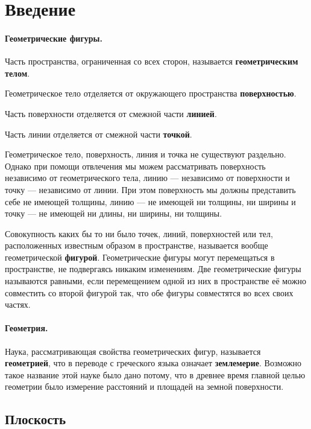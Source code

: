 \section*{Введение}

\paragraph{Геометрические фигуры.}\label{1938/1}
Часть пространства, ограниченная со всех сторон, называется \textbf{геометрическим телом}.

Геометрическое тело отделяется от окружающего пространства \textbf{поверхностью}.

Часть поверхности отделяется от смежной части \textbf{линией}.

Часть линии отделяется от смежной части \textbf{точкой}.

Геометрическое тело, поверхность, линия и точка не существуют раздельно.
Однако при помощи отвлечения мы можем рассматривать поверхность независимо от геометрического тела, линию — независимо от поверхности и точку — независимо от линии.
При этом поверхность мы должны представить себе не имеющей толщины, линию — не имеющей ни толщины, ни ширины и точку — не имеющей ни длины, ни ширины, ни толщины.

Совокупность каких бы то ни было точек, линий, поверхностей или тел, расположенных известным образом в пространстве, называется вообще геометрической \textbf{фигурой}.
Геометрические фигуры могут перемещаться в пространстве, не подвергаясь никаким изменениям.
Две геометрические фигуры называются равными, если перемещением одной из них в пространстве её можно совместить со второй фигурой так, что обе фигуры совместятся во всех своих частях.

\paragraph{Геометрия.}\label{1938/2}
Наука, рассматривающая свойства геометрических фигур, называется \textbf{геометрией}, что в переводе с греческого языка означает \textbf{землемерие}.
Возможно такое название этой науке было дано потому, что в древнее время главной целью геометрии было измерение расстояний и площадей на земной поверхности. 


\subsection*{Плоскость}

